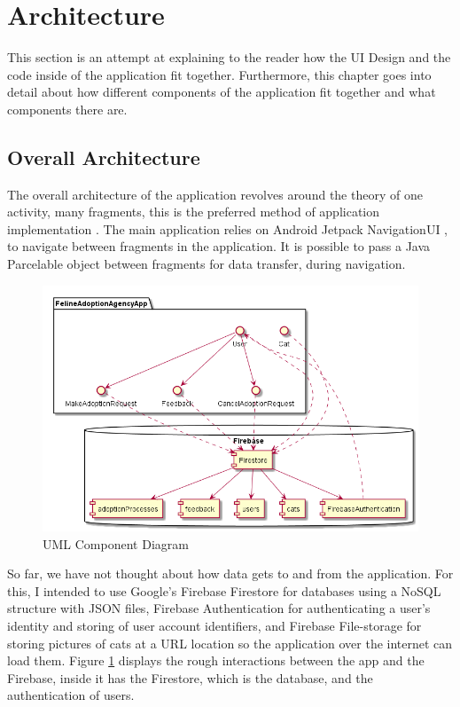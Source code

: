 \section{Architecture} \label{CODESTRUCTUREDESIGN}

This section is an attempt at explaining to the reader how the UI Design and the code inside of the application fit together. Furthermore, this chapter goes into detail about how different components of the application fit together and what components there are.

\subsection{Overall Architecture}

The overall architecture of the application revolves around the theory of one activity, many fragments, this is the preferred method of application implementation \cite{SINGLEACTIVITYAPP}. The main application relies on Android Jetpack NavigationUI \cite{NAVIGATIONUI}, to navigate between fragments in the application. It is possible to pass a Java Parcelable object between fragments for data transfer, during navigation.

    \begin{figure} [htbp!]
        \centering
        \includegraphics[width=\textwidth]{Images/ComponentDiagram.png}
        \caption{UML Component Diagram}
        \label{fig:component_diagram}
    \end{figure}
    
So far, we have not thought about how data gets to and from the application. For this, I intended to use Google's Firebase Firestore for databases using a NoSQL structure with JSON files, Firebase Authentication for authenticating a user's identity and storing of user account identifiers, and Firebase File-storage for storing pictures of cats at a URL location so the application over the internet can load them. Figure \ref{fig:component_diagram} displays the rough interactions between the app and the Firebase, inside it has the Firestore, which is the database, and the authentication of users.

